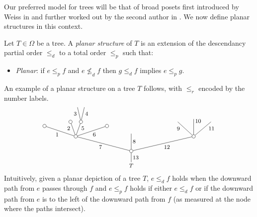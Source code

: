 \documentclass[a4paper,10pt]{article}%
\begin{document}
Our preferred model for trees will be that of broad posets first introduced by Weiss in \cite{We12} and further worked out by the second author in \cite{Pe16b}. We now define planar structures in this context.


\begin{definition}\label{PLANARIZE DEF}
	Let $T \in \Omega$ be a tree. A \textit{planar structure} of $T$ is an extension of the descendancy partial order $\leq_d$ to a total order $\leq_p$ such that: 
	\begin{itemize}
		\item \textit{Planar}: if $e \leq_p f$ and $e \nleq_d f$ then 
		$g \leq_d f$ implies $e \leq_p g$.
	\end{itemize} 
\end{definition}


\begin{example}
An example of a planar structure on a tree $T$ follows, with $\leq_r$ encoded by the number labels.
\begin{equation}\label{PLANAREX EQ}
	\begin{tikzpicture}[grow=up,auto,level distance=2.1em,
	every node/.style = {font=\footnotesize,inner sep=2pt},
	dummy/.style={circle,draw,inner sep=0pt,minimum size=1.75mm}]
		\node at (0,0) {$T$}
			child{node [dummy] {}
				child[sibling distance = 9em]{node [dummy] {}
					child[sibling distance = 2.5em]{
					edge from parent node [near end,swap] {$11$}}
					child[level distance=2.5em]{
					edge from parent node [very near end,swap] {$10$}}				
					child[sibling distance = 2.3em]{
					edge from parent node [near end] {$9$}}
				edge from parent node [swap] {12}}
				child[level distance =2.5em]{
				edge from parent node [swap] {$8$}}
				child[sibling distance = 8em]{node [dummy] {}
					child[sibling distance =3em, level distance = 1.5 em]{node [dummy] {}
					edge from parent node [swap] {$6$}}
					child[sibling distance = 1.5em]{node [dummy] {}
						child[sibling distance =1em]{
						edge from parent node [swap,near end] {$4$}}
						child[sibling distance =1em]{
						edge from parent node [near end] {$3$}}
					edge from parent node [very near end,swap] {$5$}}
					child[sibling distance =1.5em]{node [dummy] {}
					edge from parent node [very near end] {$2$}}
					child[sibling distance =3em,level distance =1.5em]{node [dummy] {}
					edge from parent node {$1$}}
				edge from parent node {$7$}}
			edge from parent node [swap] {$13$}};
	\end{tikzpicture}
\end{equation}
Intuitively, given a planar depiction of a tree $T$, $e \leq_d f$ holds when the downward path from $e$ passes through $f$
and $e \leq_p f$ holds if either
$e \leq_d f$ or if the downward path from $e$ is to the left of the downward path from $f$ (as measured at the node where the paths intersect).
\end{example}
\end{document}
